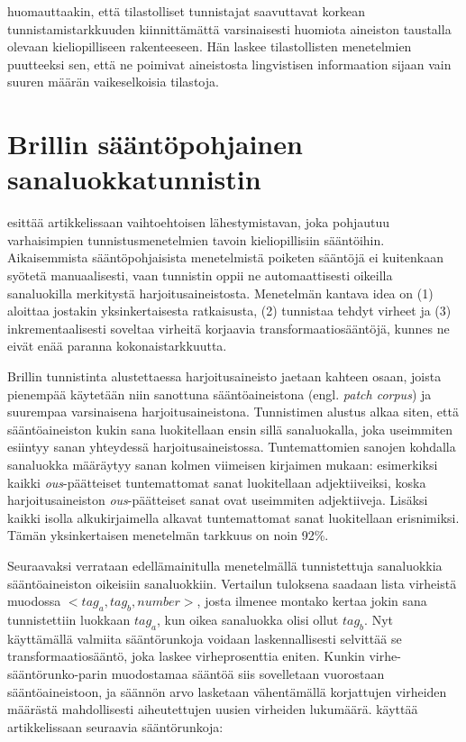 \documentclass[utf8,bachelor,manualbib]{gradu3}
\begin{document}
\citet{brill1992} huomauttaakin, että tilastolliset tunnistajat saavuttavat korkean tunnistamistarkkuuden kiinnittämättä varsinaisesti huomiota aineiston taustalla olevaan kieliopilliseen rakenteeseen. Hän laskee tilastollisten menetelmien puutteeksi sen, että ne poimivat aineistosta lingvistisen informaation sijaan vain suuren määrän vaikeselkoisia tilastoja.

\section{Brillin sääntöpohjainen sanaluokkatunnistin}

\citet{brill1992} esittää artikkelissaan vaihtoehtoisen lähestymistavan, joka pohjautuu varhaisimpien tunnistusmenetelmien tavoin kieliopillisiin sääntöihin. Aikaisemmista sääntöpohjaisista menetelmistä poiketen sääntöjä ei kuitenkaan syötetä manuaalisesti, vaan tunnistin oppii ne automaattisesti oikeilla sanaluokilla merkitystä harjoitusaineistosta. Menetelmän kantava idea on (1) aloittaa jostakin yksinkertaisesta ratkaisusta, (2) tunnistaa tehdyt virheet ja (3) inkrementaalisesti soveltaa virheitä korjaavia transformaatiosääntöjä, kunnes ne eivät enää paranna kokonaistarkkuutta.

Brillin tunnistinta alustettaessa harjoitusaineisto jaetaan kahteen osaan, joista pienempää käytetään niin sanottuna sääntöaineistona (engl. \textit{patch corpus}) ja suurempaa varsinaisena harjoitusaineistona. Tunnistimen alustus alkaa siten, että sääntöaineiston kukin sana luokitellaan ensin sillä sanaluokalla, joka useimmiten esiintyy sanan yhteydessä harjoitusaineistossa. Tuntemattomien sanojen kohdalla sanaluokka määräytyy sanan kolmen viimeisen kirjaimen mukaan: esimerkiksi kaikki \textit{ous}-päätteiset tuntemattomat sanat luokitellaan adjektiiveiksi, koska harjoitusaineiston \textit{ous}-päätteiset sanat ovat useimmiten adjektiiveja. Lisäksi kaikki isolla alkukirjaimella alkavat tuntemattomat sanat luokitellaan erisnimiksi. Tämän yksinkertaisen menetelmän tarkkuus on noin 92\%. \citep{brill1992}

Seuraavaksi verrataan edellämainitulla menetelmällä tunnistettuja sanaluokkia sääntöaineiston oikeisiin sanaluokkiin. Vertailun tuloksena saadaan lista virheistä muodossa $<tag_a, tag_b, number>$, josta ilmenee montako kertaa jokin sana tunnistettiin luokkaan $tag_a$, kun oikea sanaluokka olisi ollut $tag_b$. Nyt käyttämällä valmiita sääntörunkoja voidaan laskennallisesti selvittää se transformaatiosääntö, joka laskee virheprosenttia eniten. Kunkin virhe-sääntörunko-parin muodostamaa sääntöä siis sovelletaan vuorostaan sääntöaineistoon, ja säännön arvo lasketaan vähentämällä korjattujen virheiden määrästä mahdollisesti aiheutettujen uusien virheiden lukumäärä. \citet{brill1992} käyttää artikkelissaan seuraavia sääntörunkoja:
\end{document}
